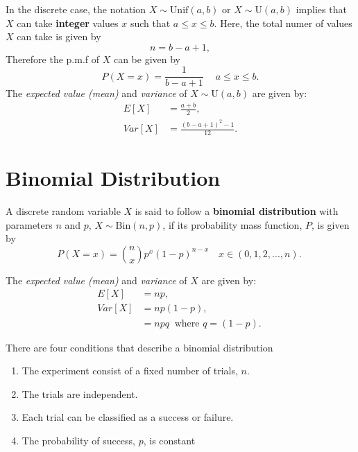 \begin{note}\label{mod2:note:DiscreteUniform}
	In the discrete case, the notation $X \sim \text{Unif}(a, b)$ or $X \sim \text{U}(a, b)$ implies that $X$ can take \textbf{integer} values $x$ such that $a \leq x \leq b$. Here, the total numer of values $X$ can take is given by
	\begin{equation}
		n = b - a + 1,
	\end{equation}
	Therefore the p.m.f of $X$ can be given by
	\begin{equation}
	P(X = x)= \frac{1}{b - a + 1}\ \quad a \leq x \leq b.
	\end{equation}
		The \textit{expected value (mean)} and \textit{variance} of $X \sim \text{U}(a,b)$ are given by:
	\begin{align}
	E[X] &= \frac{a+b}{2}, \label{mod2:eq:DiscreteUniform:Mean} \\
	Var[X] &= \frac{(b-a+1)^2 - 1}{12}. \label{mod2:eq:DiscreteUniform:Variance} 
	\end{align}
\end{note}




\section{Binomial Distribution} \label{mod2:section:Binomial}
\begin{defn} \label{mod2:defn:Binomial}
	A discrete random variable $X$ is said to follow a \textbf{binomial distribution} with parameters $n$ and $p$, $X \sim \text{Bin}(n,p)$, if its probability mass function, $P$, is given by
	\begin{equation}
	P(X = x) = { n \choose x} p^x (1-p)^{n-x} \quad x \in ( 0, 1, 2, ... , n). \label{mod2:eq:BinomialDist} \ 
	\end{equation} 
\end{defn}

\begin{note}
	The \textit{expected value (mean)} and \textit{variance} of $X$ are given by:
	\begin{align}
	E[X] &= np,  \label{mod2:eq:Binomial:Mean} \\ 
	Var[X] &= np(1-p), \label{mod2:eq:Binomial:Variance} \\
	&= npq  \: \text{ where } q = (1-p).\ 
	\end{align}
\end{note}

\begin{note} \label{mod2:note:Binomial:Conditions}
	There are four conditions that describe a binomial distribution
	\begin{enumerate}[label = (\roman*)]
		\item The experiment consist of a fixed number of trials, $n$.
		\item The trials are independent.
		\item Each trial can be classified as a success or failure.
		\item The probability of success, $p$, is constant
	\end{enumerate}
\end{note}



